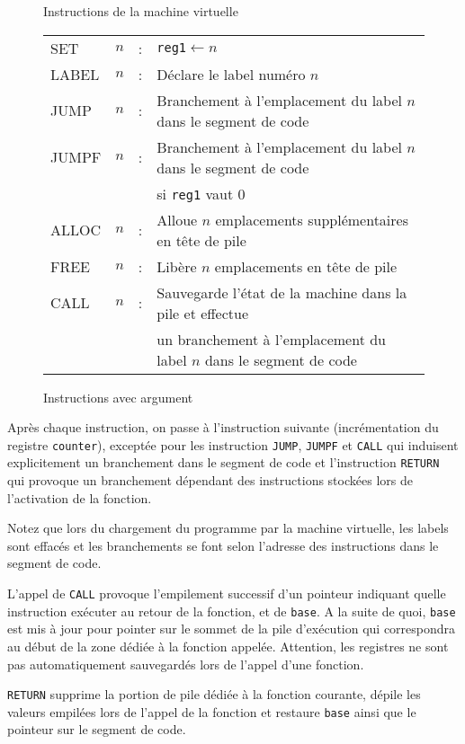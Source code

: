 \documentclass[12pt,a4]{article}
\begin{document}
\begin{figure}
  \caption{Instructions de la machine virtuelle}
  \label{fig:instruct}
\end{figure}

\begin{figure}
  \centering
  \begin{tabular}{llll}
    SET   &$n$&:& {\tt reg1}$\leftarrow n$\\
    LABEL &$n$&:& Déclare le label numéro $n$\\
    JUMP  &$n$&:& Branchement à l'emplacement du label $n$ dans le segment de code\\
    JUMPF &$n$&:& Branchement à l'emplacement du label $n$ dans le segment de code\\
    &&& si {\tt reg1} vaut $0$\\
    ALLOC &$n$&:& Alloue $n$ emplacements supplémentaires en tête de
    pile\\
    FREE  &$n$&:& Libère $n$ emplacements en tête de pile\\
    CALL  &$n$&:& Sauvegarde l'état de la machine dans la pile et effectue \\
    &&& un branchement à l'emplacement du label $n$ dans le segment de code\\
  \end{tabular}
  \caption{Instructions avec argument}
\label{fig:instructarg}
\end{figure}

Après chaque instruction, on passe à l'instruction suivante
(incrémentation du registre {\tt counter}), exceptée
pour les instruction {\tt JUMP}, {\tt JUMPF} et {\tt CALL} qui
induisent explicitement un branchement dans le segment de code
et l'instruction {\tt RETURN} qui provoque un branchement dépendant
des instructions stockées lors de l'activation de la fonction.

Notez que lors du chargement du programme par la machine virtuelle,
les labels sont effacés et les branchements se font selon l'adresse
des instructions dans le segment de code.

L'appel de {\tt CALL} provoque l'empilement successif d'un pointeur
indiquant quelle instruction exécuter au
retour de la fonction, et de {\tt base}. A la suite de quoi,
{\tt base} est mis à jour pour pointer sur le sommet de la pile
d'exécution
qui correspondra au début de la zone dédiée à la fonction appelée.
Attention, les registres ne sont pas automatiquement sauvegardés lors
de l'appel d'une fonction.

{\tt RETURN} supprime la portion de pile dédiée à la fonction
courante, dépile les valeurs empilées lors de l'appel de la fonction
et restaure {\tt base} ainsi que le pointeur sur le segment de code.
\end{document}
